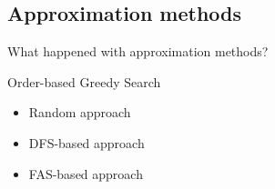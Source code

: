 \subsection{Approximation methods}

\begin{frame}
	\begin{center}
		\large
		What happened with approximation methods?
	\end{center}
	\begin{block}{Order-based Greedy Search}
		\begin{itemize}
			\item Random approach
			\item DFS-based approach
			\item FAS-based approach
		\end{itemize}
	\end{block}
\end{frame}

\begin{frame}
	
\end{frame}